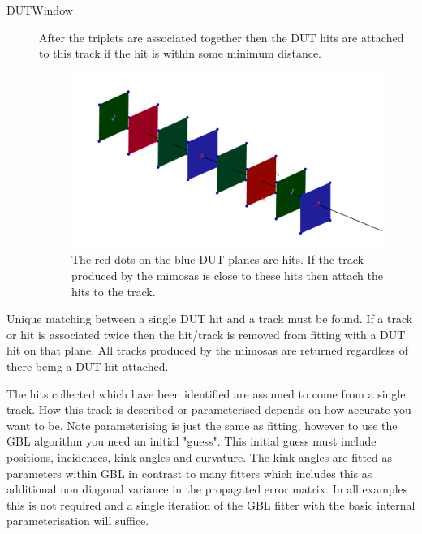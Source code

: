 \begin{description}
\item[DUTWindow] After the triplets are associated together then the DUT hits are attached to this track if the hit is within some minimum distance. 
\begin{figure}[H]
\centering
\includegraphics[width=1.0\linewidth]{figures/DUThitsPat.png}
\caption{The red dots on the blue DUT planes are hits. If the track produced by the mimosas is close to these hits then attach the hits to the track.}
\label{fig:DoubDis}
\end{figure}


\end{description}

Unique matching between a single DUT hit and a track must be found. If a track or hit is associated twice then the hit/track is removed from fitting with a DUT hit on that plane. All tracks produced by the mimosas are returned regardless of there being a DUT hit attached.

The hits collected which have been identified are assumed to come from a single track. How this track is described or parameterised depends on how accurate you want to be. Note parameterising is just the same as fitting, however to use the GBL algorithm you need an initial "guess". This initial guess must include positions, incidences, kink angles and curvature. The kink angles are fitted as parameters within GBL in contrast to many fitters which includes this as additional non diagonal variance in the propagated error matrix. In all examples this is not required and a single iteration of the GBL fitter with the basic internal parameterisation will suffice.




